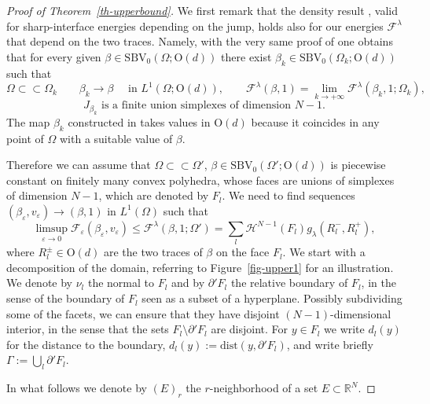 \documentclass[a4paper,reqno]{amsart}
\newcommand\R{\mathbb{R}}
\newcommand{\SBV}{\mathrm{SBV}}
\newcommand\dist{{\mathrm{dist}}}
\newcommand\eps{{\varepsilon}}
\theoremstyle{remark}
\newcommand{\F}{\mathcal{F}}
\newcommand{\On}{\mathrm{O}(d)}
\numberwithin{equation}{section}
\begin{document}
\begin{proof}[Proof of Theorem~\ref{th-upperbound}]
	We first remark that the density result
	\cite[Lemma~4.1]{BCG14}, valid for sharp-interface energies depending on the jump,  holds also for our energies 
$\F^\lambda$ that depend on the two traces. Namely, with the very same proof of  \cite[Lemma~4.1]{BCG14} one obtains that for every
	given $\beta \in \SBV_0(\Omega; \On)$ there exist $\beta_k \in \SBV_0(\Omega_k; \On)$ such that
	\begin{equation*}
\Omega\subset\subset\Omega_k \qquad
\beta_k \to \beta \quad \text{ in }L^1(\Omega; \On), \qquad
\F^\lambda(\beta,1)=\lim_{k\to +\infty}\F^\lambda(\beta_k,1; \Omega_k),
	\end{equation*}
	\begin{equation*}
J_{\beta_k} \text{ is a finite union simplexes of dimension $N-1$.}
	\end{equation*}
The map $\beta_k$
 constructed in  \cite[Lemma~4.1]{BCG14}
takes values in $\On$ because  it coincides in any point of $\Omega$ with a suitable value of $\beta$.
	

	Therefore we can assume that
	$\Omega\subset\subset\Omega'$,
	$\beta\in \SBV_0(\Omega';\On)$ is piecewise constant on finitely many convex polyhedra,
	whose faces are unions of simplexes of dimension $N-1$, which are denoted by $F_l$.
	We need to find sequences $(\beta_\eps,v_\eps)\to (\beta,1)$ in $L^1(\Omega)$ such that
	\begin{equation*}
\limsup_{\eps\to0} \F_\eps(\beta_\eps,v_\eps)\le \F^\lambda(\beta,1;\Omega')
=\sum_l \mathcal H^{N-1}(F_l) g_\lambda(R^-_l, R^+_l),
	\end{equation*}
	where $R^\pm_l\in\On$ are the two traces of $\beta$ on the face $F_l$.
	We start with a decomposition of the domain, referring to Figure~\ref{fig-upper1} for an illustration.
 	We denote by $\nu_l$ the normal to $F_l$
 	and  by $\partial'F_l$
	the relative boundary of $F_l$, in the sense of the boundary of $F_l$ seen as a subset of a hyperplane.
	Possibly subdividing some of the facets, we can ensure that
	they have disjoint $(N-1)$-dimensional interior, in the sense that
	the sets $F_l\setminus\partial'F_l$ are disjoint.
	For $y\in F_l$ we write $d_l(y)$ for the distance to the boundary, $d_l(y):=\dist(y,\partial'F_l)$, and write briefly $\Gamma:=\bigcup_l \partial'F_l$.
	
	In what follows we denote by $(E)_r$ the $r$-neighborhood of a set $E\subset \R^N$.
	

\end{proof}
\end{document}

